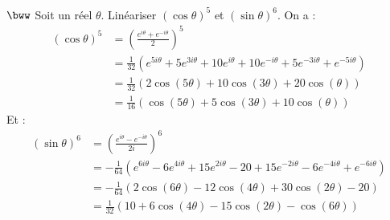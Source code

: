 \documentclass[11pt]{article}
\begin{document}
\begin{exercice}{$\bww$}{}
    Soit un réel $\theta$. Linéariser $(\cos\theta)^5$ et $(\sin\theta)^6$.
    \tcblower
    On a :
    \begin{align*}
        (\cos\theta)^5&=\left(\frac{e^{i\theta}+e^{-i\theta}}{2}\right)^5\\
        &=\frac{1}{32}\left(e^{5i\theta}+5e^{3i\theta}+10e^{i\theta}+10e^{-i\theta}+5e^{-3i\theta}+e^{-5i\theta}\right)\\
        &=\frac{1}{32}\left(2\cos(5\theta)+10\cos(3\theta)+20\cos(\theta)\right)\\
        &=\frac{1}{16}\left(\cos(5\theta)+5\cos(3\theta)+10\cos(\theta)\right)
    \end{align*}
    Et :
    \begin{align*}
        (\sin\theta)^6&=\left(\frac{e^{i\theta}-e^{-i\theta}}{2i}\right)^6\\
        &=-\frac{1}{64}\left(e^{6i\theta}-6e^{4i\theta}+15e^{2i\theta}-20+15e^{-2i\theta}-6e^{-4i\theta}+e^{-6i\theta}\right)\\
        &=-\frac{1}{64}\left(2\cos(6\theta)-12\cos(4\theta)+30\cos(2\theta)-20\right)\\
        &=\frac{1}{32}\left(10 + 6\cos(4\theta) - 15\cos(2\theta) - \cos(6\theta)\right)
    \end{align*}
\end{exercice}
\end{document}
